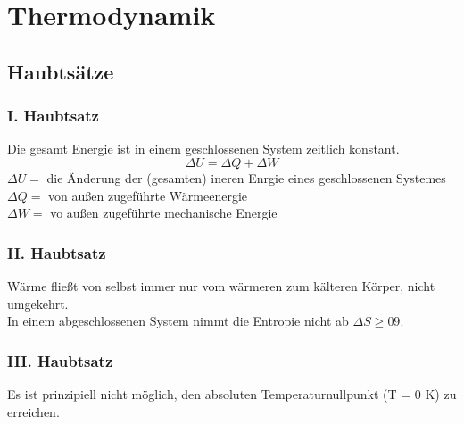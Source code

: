 \documentclass[11pt,letterpaper]{article}
\begin{document}
\maketitle
  
\tableofcontents

\section{Thermodynamik}
\subsection{Haubtsätze}

 \subsubsection{I. Haubtsatz}
 {
    Die gesamt Energie ist in einem geschlossenen System zeitlich konstant.
    \begin{equation*}
        \Delta U = \Delta Q + \Delta W
    \end{equation*} 
    $\Delta U =$ die Änderung der (gesamten) ineren Enrgie eines geschlossenen Systemes\\
    $\Delta Q =$ von außen zugeführte Wärmeenergie\\
    $\Delta W =$ vo außen zugeführte mechanische Energie\\ 
 }

 \subsubsection{II. Haubtsatz}
 {
    Wärme fließt von selbst immer nur vom wärmeren zum kälteren Körper, nicht
    umgekehrt.\\
    In einem abgeschlossenen System nimmt die Entropie nicht ab $\Delta S \ge09$.
 }

 \subsubsection{III. Haubtsatz}
 {
    Es ist prinzipiell nicht möglich, den absoluten Temperaturnullpunkt (T = 0 K)
    zu erreichen.
 }
\end{document}

